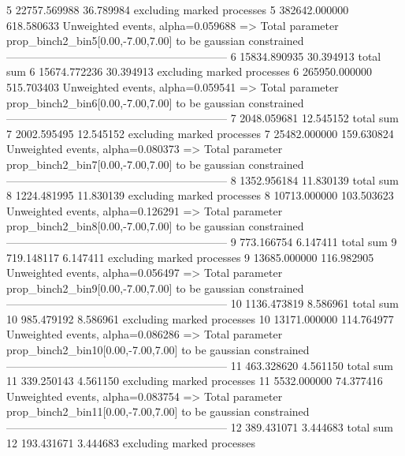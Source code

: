 5          22757.569988    36.789984       excluding marked processes    
5          382642.000000   618.580633      Unweighted events, alpha=0.059688
  => Total parameter prop_binch2_bin5[0.00,-7.00,7.00] to be gaussian constrained
------------------------------------------------------------
6          15834.890935    30.394913       total sum                     
6          15674.772236    30.394913       excluding marked processes    
6          265950.000000   515.703403      Unweighted events, alpha=0.059541
  => Total parameter prop_binch2_bin6[0.00,-7.00,7.00] to be gaussian constrained
------------------------------------------------------------
7          2048.059681     12.545152       total sum                     
7          2002.595495     12.545152       excluding marked processes    
7          25482.000000    159.630824      Unweighted events, alpha=0.080373
  => Total parameter prop_binch2_bin7[0.00,-7.00,7.00] to be gaussian constrained
------------------------------------------------------------
8          1352.956184     11.830139       total sum                     
8          1224.481995     11.830139       excluding marked processes    
8          10713.000000    103.503623      Unweighted events, alpha=0.126291
  => Total parameter prop_binch2_bin8[0.00,-7.00,7.00] to be gaussian constrained
------------------------------------------------------------
9          773.166754      6.147411        total sum                     
9          719.148117      6.147411        excluding marked processes    
9          13685.000000    116.982905      Unweighted events, alpha=0.056497
  => Total parameter prop_binch2_bin9[0.00,-7.00,7.00] to be gaussian constrained
------------------------------------------------------------
10         1136.473819     8.586961        total sum                     
10         985.479192      8.586961        excluding marked processes    
10         13171.000000    114.764977      Unweighted events, alpha=0.086286
  => Total parameter prop_binch2_bin10[0.00,-7.00,7.00] to be gaussian constrained
------------------------------------------------------------
11         463.328620      4.561150        total sum                     
11         339.250143      4.561150        excluding marked processes    
11         5532.000000     74.377416       Unweighted events, alpha=0.083754
  => Total parameter prop_binch2_bin11[0.00,-7.00,7.00] to be gaussian constrained
------------------------------------------------------------
12         389.431071      3.444683        total sum                     
12         193.431671      3.444683        excluding marked processes    
